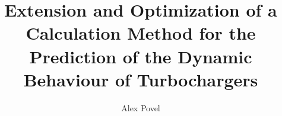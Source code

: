 \providecommand*{\symbf}{\mathbf}
\newcommand*{\vect}[2]{\ensuremath{\vec{\symbf{#1}}_{\text{#2}}}}%
\newcommand*{\vectcomp}[3]{\ensuremath{\symbf{#1}_{\text{#2#3}}}}%
\providecommand{\dd}[1]{\ensuremath{\textnormal{d}#1}}%
\newcommand*{\smlnk}{%
	Simulink%
	\nobreak
	\textsuperscript{\textregistered}%
}%
\newcommand*{\mtlb}{%
	MATLAB%
	\nobreak
	\textsuperscript{\textregistered}%
}%
\newcommand*{\mtlbsymb}{%
	Symbolic Math Toolbox%
	\nobreak
	\textsuperscript{\texttrademark}%
}%
\newcommand*{\mtlbsmlnk}{%
	\mtlb %
	\kern-0.25em %
	\slash %
	\nobreak %
	\hspace{0pt}%
	\smlnk
}%
\newcommand*{\smscp}{%
	Simscape%
	\nobreak%
	\textsuperscript{\texttrademark}%
}%
\newcommand*{\fortran}{%
FORTRAN\term{FORTRAN}%
}%
\title{Extension and Optimization of a Calculation Method for the Prediction of the Dynamic Behaviour of Turbochargers}
\date{}
\author{Alex Povel}
\usepackage{hologo}
